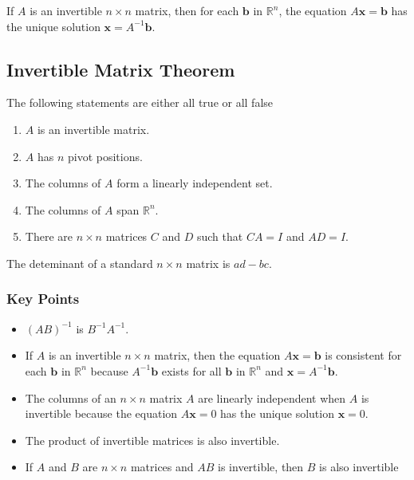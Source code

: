 \documentclass{article}
\begin{document}
If $A$ is an invertible $n\times n$ matrix, then for each $\mathbf{b}$ in $\mathbb{R}^n$, the
equation $A\mathbf{x}=\mathbf{b}$ has the unique solution $\mathbf{x}=A^{-1}\mathbf{b}$.

\subsection*{Invertible Matrix Theorem}
The following statements are either all true or all false
\begin{enumerate}
    \item $A$ is an invertible matrix.
    \item $A$ has $n$ pivot positions.
    \item The columns of $A$ form a linearly independent set.
    \item The columns of $A$ span $\mathbb{R}^n$.
    \item There are $n\times n$ matrices $C$ and $D$ such that $CA=I$ and $AD=I$.
\end{enumerate}

The deteminant of a standard $n\times n$ matrix is $ad-bc$.

\subsubsection*{Key Points}
\begin{itemize}
    \item $(AB)^{-1}$ is $B^{-1}A^{-1}$.
    \item If $A$ is an invertible $n\times n$ matrix, then the equation $A\mathbf{x}=\mathbf{b}$ is
    consistent for each $\mathbf{b}$ in $\mathbb{R}^n$ because $A^{-1}\mathbf{b}$ exists for all
    $\mathbf{b}$ in $\mathbb{R}^n$ and $\mathbf{x}=A^{-1}\mathbf{b}$.
    \item The columns of an $n\times n$ matrix $A$ are linearly independent when $A$ is invertible
    because the equation $A\mathbf{x}=0$ has the unique solution $\mathbf{x}=0$.
    \item The product of invertible matrices is also invertible.
    \item If $A$ and $B$ are $n\times n$ matrices and $AB$ is invertible, then $B$ is also
    invertible
\end{itemize}
\end{document}
